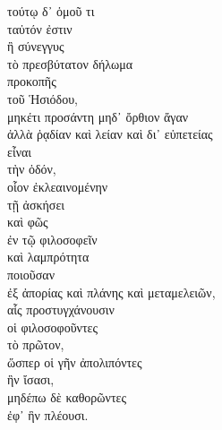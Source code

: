 {\large
\begin{greek}
\noindent τούτῳ δ᾽ ὁμοῦ τι\\
ταὐτόν ἐστιν \\
ἢ σύνεγγυς \\
τὸ πρεσβύτατον δήλωμα \\
\tabto{2em} προκοπῆς\\
\tabto{2em} τοῦ Ἡσιόδου, \\
\tabto{2em} μηκέτι προσάντη μηδ᾽ ὄρθιον ἄγαν \\
\tabto{2em} ἀλλὰ ῥᾳδίαν καὶ λείαν καὶ δι᾽ εὐπετείας \\
\tabto{2em} εἶναι \\
\tabto{2em} τὴν ὁδόν, \\
\tabto{4em} οἷον ἐκλεαινομένην \\
\tabto{6em} τῇ ἀσκήσει \\
\tabto{4em} καὶ φῶς \\
\tabto{6em} ἐν τῷ φιλοσοφεῖν \\
\tabto{4em} καὶ λαμπρότητα \\
\tabto{4em} ποιοῦσαν \\
\tabto{6em} ἐξ ἀπορίας καὶ πλάνης καὶ μεταμελειῶν, \\
\tabto{8em} αἷς προστυγχάνουσιν \\
\tabto{8em} οἱ φιλοσοφοῦντες \\
\tabto{8em} τὸ πρῶτον, \\
\tabto{10em} ὥσπερ οἱ γῆν ἀπολιπόντες \\
\tabto{12em} ἣν ἴσασι, \\
\tabto{10em} μηδέπω δὲ καθορῶντες \\
\tabto{12em} ἐφ᾽ ἣν πλέουσι. \\

\end{greek}
}

